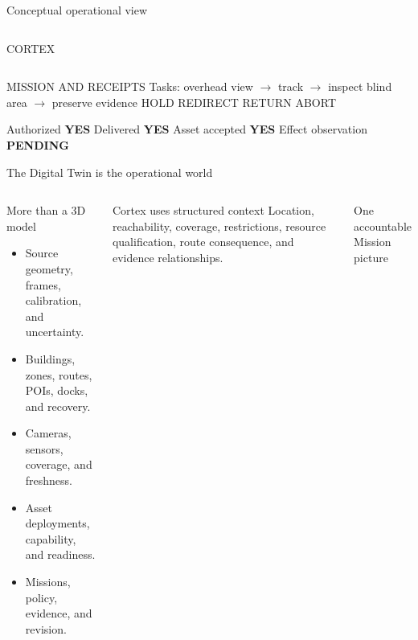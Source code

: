 \documentclass[aspectratio=169,10pt]{beamer}
\begin{document}
\begin{frame}{Conceptual operational view}
\begin{columns}[T]
\begin{block}{CORTEX}
\end{block}
\end{columns}
\vspace{2mm}
\begin{block}{MISSION AND RECEIPTS}
\scriptsize Tasks: overhead view $\rightarrow$ track $\rightarrow$ inspect blind area $\rightarrow$ preserve evidence \hfill HOLD \quad REDIRECT \quad RETURN \quad ABORT\par\vspace{1mm}
Authorized {\color{green}\bfseries YES} \quad Delivered {\color{green}\bfseries YES} \quad Asset accepted {\color{green}\bfseries YES} \quad Effect observation {\color{amber}\bfseries PENDING}
\end{block}
\end{frame}

\begin{frame}{The Digital Twin is the operational world}
\begin{columns}[T]
\begin{block}{More than a 3D model}
\small
\begin{itemize}
  \item Source geometry, frames, calibration, and uncertainty.
  \item Buildings, zones, routes, POIs, docks, and recovery.
  \item Cameras, sensors, coverage, and freshness.
  \item Asset deployments, capability, and readiness.
  \item Missions, policy, evidence, and revision.
\end{itemize}
\end{block}
\begin{block}{Cortex uses structured context}
\small Location, reachability, coverage, restrictions, resource qualification, route consequence, and evidence relationships.
\end{block}
\begin{block}{One accountable Mission picture}
\centering
{}
\end{block}
\end{columns}
\end{frame}
\end{document}
